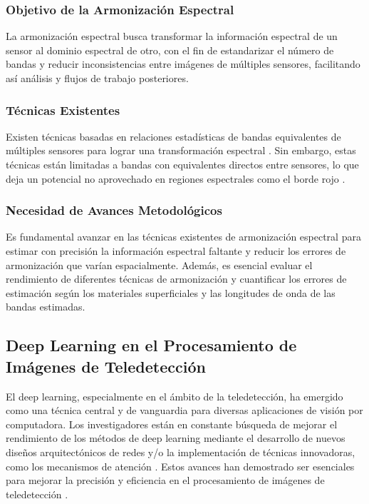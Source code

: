             \subsubsection{Objetivo de la Armonización Espectral}
                La armonización espectral busca transformar la información espectral de un sensor al dominio espectral de otro, con el fin de estandarizar el número de bandas y reducir inconsistencias entre imágenes de múltiples sensores, facilitando así análisis y flujos de trabajo posteriores.
                
            \subsubsection{Técnicas Existentes}
                Existen técnicas basadas en relaciones estadísticas de bandas equivalentes de múltiples sensores para lograr una transformación espectral \autocite{chastain2019empirical, claverie2018harmonized, flood2014continuity, roy2016characterization}. Sin embargo, estas técnicas están limitadas a bandas con equivalentes directos entre sensores, lo que deja un potencial no aprovechado en regiones espectrales como el borde rojo \autocite{filella1994red}.
                
            \subsubsection{Necesidad de Avances Metodológicos}
                Es fundamental avanzar en las técnicas existentes de armonización espectral para estimar con precisión la información espectral faltante y reducir los errores de armonización que varían espacialmente. Además, es esencial evaluar el rendimiento de diferentes técnicas de armonización y cuantificar los errores de estimación según los materiales superficiales y las longitudes de onda de las bandas estimadas.
                
        \subsection{Deep Learning en el Procesamiento de Imágenes de Teledetección}
            El deep learning, especialmente en el ámbito de la teledetección, ha emergido como una técnica central y de vanguardia para diversas aplicaciones de visión por computadora. Los investigadores están en constante búsqueda de mejorar el rendimiento de los métodos de deep learning mediante el desarrollo de nuevos diseños arquitectónicos de redes y/o la implementación de técnicas innovadoras, como los mecanismos de atención \autocite{ghaffarian2021effect}. Estos avances han demostrado ser esenciales para mejorar la precisión y eficiencia en el procesamiento de imágenes de teledetección \autocite{wang2022review}.
            
